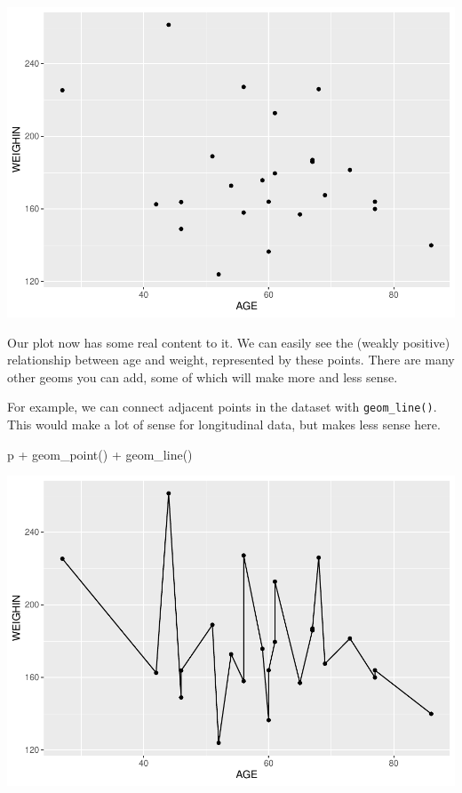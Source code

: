 \documentclass[
]{book}
\newenvironment{Shaded}{\begin{snugshade}}{\end{snugshade}}
\newcommand{\FunctionTok}[1]{\textcolor[rgb]{0.00,0.00,0.00}{#1}}
\newcommand{\NormalTok}[1]{#1}
\newcommand{\SpecialCharTok}[1]{\textcolor[rgb]{0.00,0.00,0.00}{#1}}
\begin{document}
\includegraphics{_main_files/figure-latex/unnamed-chunk-89-1.pdf}

Our plot now has some real content to it. We can easily see the (weakly positive) relationship between age and weight, represented by these points. There are many other geoms you can add, some of which will make more and less sense.

For example, we can connect adjacent points in the dataset with \texttt{geom\_line()}. This would make a lot of sense for longitudinal data, but makes less sense here.

\begin{Shaded}
\begin{Highlighting}[]
\NormalTok{p }\SpecialCharTok{+} 
  \FunctionTok{geom\_point}\NormalTok{() }\SpecialCharTok{+}
  \FunctionTok{geom\_line}\NormalTok{()}
\end{Highlighting}
\end{Shaded}

\includegraphics{_main_files/figure-latex/unnamed-chunk-90-1.pdf}
\end{document}
